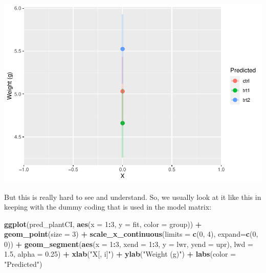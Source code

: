 \documentclass[
]{book}
\newenvironment{Shaded}{\begin{snugshade}}{\end{snugshade}}
\newcommand{\DataTypeTok}[1]{\textcolor[rgb]{0.13,0.29,0.53}{#1}}
\newcommand{\DecValTok}[1]{\textcolor[rgb]{0.00,0.00,0.81}{#1}}
\newcommand{\FloatTok}[1]{\textcolor[rgb]{0.00,0.00,0.81}{#1}}
\newcommand{\KeywordTok}[1]{\textcolor[rgb]{0.13,0.29,0.53}{\textbf{#1}}}
\newcommand{\NormalTok}[1]{#1}
\newcommand{\OperatorTok}[1]{\textcolor[rgb]{0.81,0.36,0.00}{\textbf{#1}}}
\newcommand{\StringTok}[1]{\textcolor[rgb]{0.31,0.60,0.02}{#1}}
\begin{document}
\includegraphics{worstr_files/figure-latex/unnamed-chunk-259-1.pdf}

But this is really hard to see and understand. So, we usually look at it like this in keeping with the dummy coding that is used in the model matrix:

\begin{Shaded}
\begin{Highlighting}[]
\KeywordTok{ggplot}\NormalTok{(pred_plantCI, }\KeywordTok{aes}\NormalTok{(}\DataTypeTok{x =} \DecValTok{1}\OperatorTok{:}\DecValTok{3}\NormalTok{, }\DataTypeTok{y =}\NormalTok{ fit, }\DataTypeTok{color =}\NormalTok{ group)) }\OperatorTok{+}
\StringTok{  }\KeywordTok{geom_point}\NormalTok{(}\DataTypeTok{size =} \DecValTok{3}\NormalTok{) }\OperatorTok{+}\StringTok{ }
\StringTok{  }\KeywordTok{scale_x_continuous}\NormalTok{(}\DataTypeTok{limits =} \KeywordTok{c}\NormalTok{(}\DecValTok{0}\NormalTok{,  }\DecValTok{4}\NormalTok{), }\DataTypeTok{expand=}\KeywordTok{c}\NormalTok{(}\DecValTok{0}\NormalTok{, }\DecValTok{0}\NormalTok{)) }\OperatorTok{+}
\StringTok{  }\KeywordTok{geom_segment}\NormalTok{(}\KeywordTok{aes}\NormalTok{(}\DataTypeTok{x =} \DecValTok{1}\OperatorTok{:}\DecValTok{3}\NormalTok{, }\DataTypeTok{xend =} \DecValTok{1}\OperatorTok{:}\DecValTok{3}\NormalTok{, }\DataTypeTok{y =}\NormalTok{ lwr, }\DataTypeTok{yend =}\NormalTok{ upr),}
               \DataTypeTok{lwd =} \FloatTok{1.5}\NormalTok{, }\DataTypeTok{alpha =} \FloatTok{0.25}\NormalTok{) }\OperatorTok{+}
\StringTok{  }\KeywordTok{xlab}\NormalTok{(}\StringTok{"X[, i]"}\NormalTok{) }\OperatorTok{+}
\StringTok{  }\KeywordTok{ylab}\NormalTok{(}\StringTok{"Weight (g)"}\NormalTok{) }\OperatorTok{+}
\StringTok{  }\KeywordTok{labs}\NormalTok{(}\DataTypeTok{color =} \StringTok{"Predicted"}\NormalTok{)}
\end{Highlighting}
\end{Shaded}
\end{document}
